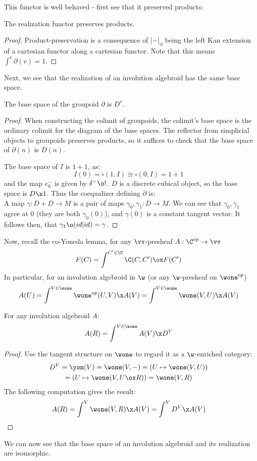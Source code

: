 This functor is well behaved - first see that it preserved products:
\begin{lemma}
	The realization functor preserves products.
\end{lemma}
\begin{proof}
	Product-preservation is a consequence of $|-|_\partial$ being the left Kan extension of a cartesian functor along a cartesian functor.
	Note that this means $\int^v\partial(v) = 1$.
\end{proof}
Next, we see that the realization of an involution algebroid has the same base space.

\begin{lemma}\label{lem:base-of-groupoid}
	The base space of the groupoid $\partial$ is $D^v$.
\end{lemma}
\begin{proof}
	When constructing the colimit of groupoids, the colimit's base space is the ordinary colimit for the diagram of the base spaces. The reflector from simplicial objects to groupoids preserves products, so it suffices to check that the base space of $\partial(n)$ is $D(n)$.

	The base space of $I$ is $1+1$, as:
	\[
		I(0) = \widehat{\square}(1,I) \cong \square(0,I) = 1 + 1
	\]
	and the map $e^-_0$ is given by $\delta^- \o !$.
	$D$ is a discrete cubical object, so the base space is $D \x 1$.
	Thus the coequalizer defining $\partial$ is:
	\[\]
	A map $\gamma: D + D \to M$ is a pair of maps $\gamma_0, \gamma_1: D \to M$.
	We can see that $\gamma_0, \gamma_1$ agree at $0$ (they are both $\gamma_0(0)$), and $\gamma(0)$ is a constant tangent vector. It follows then, that $\gamma_1 \o (id | id) = \gamma$.
\end{proof}

Now, recall the co-Yoneda lemma, for any $\vv$-presheaf $A: \C^{op} \to \vv$
\[
	F(C) = \int^{C' \in \C} \C(C,C') \ox F(C')
\]
In particular, for an involution algebroid in $\w$ (or any $\w$-presheaf on $\wone^{op}$)
\[
	A(U) = \int^{V \in \wone} \wone^{op}(U,V) \x A(V) = \int^{V \in \wone} \wone(V,U) \x A(V)
\]
\begin{lemma}\label{lem:as-a-presheaf}
	For any involution algebroid $A$:
	\[ A(R) = \int^{V \in \wone} A(V) \x D^V \]
\end{lemma}
\begin{proof}
	Use the tangent structure on $\wone$ to regard it as a $\w$-enriched category:
	\begin{gather*}
		D^V = \yon(V) = \wone(V,-) = (U \mapsto \wone(V, U))  \\= (U \mapsto \wone(V, U\ox R)) = \wone(V,R)
	\end{gather*}
	The following computation gives the result:
	\[
		A(R) = \int^{V} \wone(V,R) \x A(V) = \int^{V} D^V \x A(V)
	\]
\end{proof}
We can now see that the base space of an involution algebroid and its realization are isomorphic.

